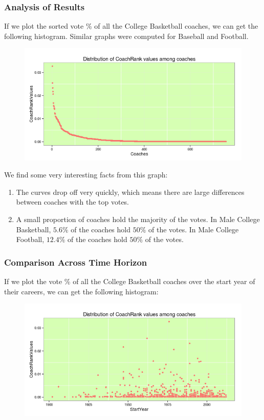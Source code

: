 \documentclass[11pt,notitlepage]{article}
\begin{document}
\subsubsection*{Analysis of Results}

\noindent If we plot the sorted vote \% of all the College Basketball coaches, we can get the following histogram. Similar graphs were computed for Baseball and Football.

\begin{figure}[H]
      \centering
      \includegraphics[width=1\textwidth]{graphs/basketball_score_dist.png}
 \end{figure}

\noindent We find some very interesting facts from this graph:

\begin{enumerate}
\item The curves drop off very quickly, which means there are large differences between coaches with the top votes.
\item A small proportion of coaches hold the majority of the votes. In Male College Basketball, $5.6\%$ of the coaches hold $50\%$ of the votes. In Male College Football, $12.4\%$ of the coaches hold $50\%$ of the votes.
\end{enumerate}

\subsubsection*{Comparison Across Time Horizon}

If we plot the vote \% of all the College Basketball coaches over the start year of their careers, we can get the following histogram:

\begin{figure}[H]
      \centering
      \includegraphics[width=1\textwidth]{graphs/time_horizon.png}
 \end{figure}
\end{document}
